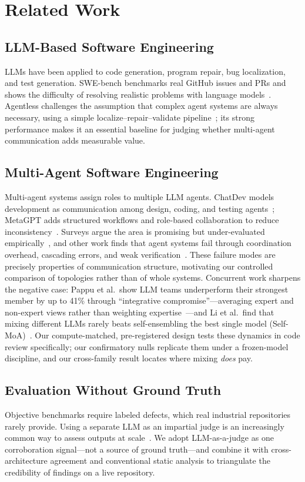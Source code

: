 \documentclass[conference]{IEEEtran}
\begin{document}
\section{Related Work}

\subsection{LLM-Based Software Engineering}
LLMs have been applied to code generation, program repair, bug localization,
and test generation. SWE-bench benchmarks real GitHub issues and PRs and
shows the difficulty of resolving realistic problems with language
models~\cite{swebench}. Agentless challenges the assumption that complex
agent systems are always necessary, using a simple localize--repair--validate
pipeline~\cite{agentless}; its strong performance makes it an essential
baseline for judging whether multi-agent communication adds measurable
value.

\subsection{Multi-Agent Software Engineering}
Multi-agent systems assign roles to multiple LLM agents. ChatDev models
development as communication among design, coding, and testing
agents~\cite{chatdev}; MetaGPT adds structured workflows and role-based
collaboration to reduce inconsistency~\cite{metagpt}. Surveys argue the area
is promising but under-evaluated empirically~\cite{survey}, and other work
finds that agent systems fail through coordination overhead, cascading
errors, and weak verification~\cite{whyfail}. These failure modes are
precisely properties of communication structure, motivating our controlled
comparison of topologies rather than of whole systems. Concurrent work
sharpens the negative case: Pappu et al.\ show LLM teams underperform
their strongest member by up to 41\% through ``integrative
compromise''---averaging expert and non-expert views rather than
weighting expertise~\cite{pappu}---and Li et al.\ find that mixing
different LLMs rarely beats self-ensembling the best single model
(Self-MoA)~\cite{selfmoa}. Our compute-matched, pre-registered design
tests these dynamics in code review specifically; our confirmatory nulls
replicate them under a frozen-model discipline, and our cross-family
result locates where mixing \emph{does} pay.

\subsection{Evaluation Without Ground Truth}
Objective benchmarks require labeled defects, which real industrial
repositories rarely provide. Using a separate LLM as an impartial judge is
an increasingly common way to assess outputs at scale~\cite{llmjudge}. We
adopt LLM-as-a-judge as one corroboration signal---not a source of ground
truth---and combine it with cross-architecture agreement and conventional
static analysis to triangulate the credibility of findings on a live
repository.
\end{document}
